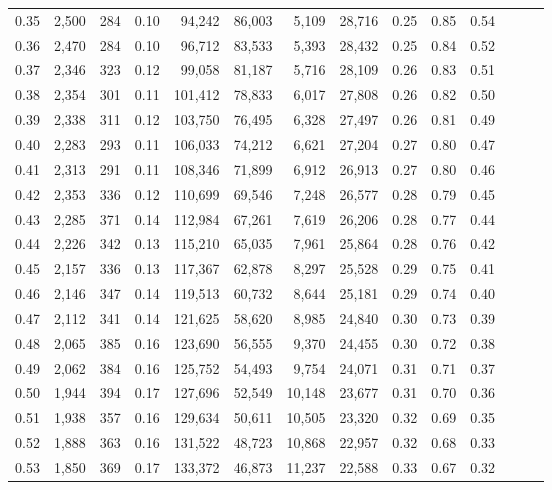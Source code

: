 \begin{tabular}{rrrrrrrrrrrrrr}
0.35 &  2,500 &    284 &  0.10 &   94,242 &   86,003 &   5,109 &  28,716 &  0.25 &  0.85 &      0.54 \\
0.36 &  2,470 &    284 &  0.10 &   96,712 &   83,533 &   5,393 &  28,432 &  0.25 &  0.84 &      0.52 \\
0.37 &  2,346 &    323 &  0.12 &   99,058 &   81,187 &   5,716 &  28,109 &  0.26 &  0.83 &      0.51 \\
0.38 &  2,354 &    301 &  0.11 &  101,412 &   78,833 &   6,017 &  27,808 &  0.26 &  0.82 &      0.50 \\
0.39 &  2,338 &    311 &  0.12 &  103,750 &   76,495 &   6,328 &  27,497 &  0.26 &  0.81 &      0.49 \\
0.40 &  2,283 &    293 &  0.11 &  106,033 &   74,212 &   6,621 &  27,204 &  0.27 &  0.80 &      0.47 \\
0.41 &  2,313 &    291 &  0.11 &  108,346 &   71,899 &   6,912 &  26,913 &  0.27 &  0.80 &      0.46 \\
0.42 &  2,353 &    336 &  0.12 &  110,699 &   69,546 &   7,248 &  26,577 &  0.28 &  0.79 &      0.45 \\
0.43 &  2,285 &    371 &  0.14 &  112,984 &   67,261 &   7,619 &  26,206 &  0.28 &  0.77 &      0.44 \\
0.44 &  2,226 &    342 &  0.13 &  115,210 &   65,035 &   7,961 &  25,864 &  0.28 &  0.76 &      0.42 \\
0.45 &  2,157 &    336 &  0.13 &  117,367 &   62,878 &   8,297 &  25,528 &  0.29 &  0.75 &      0.41 \\
0.46 &  2,146 &    347 &  0.14 &  119,513 &   60,732 &   8,644 &  25,181 &  0.29 &  0.74 &      0.40 \\
0.47 &  2,112 &    341 &  0.14 &  121,625 &   58,620 &   8,985 &  24,840 &  0.30 &  0.73 &      0.39 \\
0.48 &  2,065 &    385 &  0.16 &  123,690 &   56,555 &   9,370 &  24,455 &  0.30 &  0.72 &      0.38 \\
0.49 &  2,062 &    384 &  0.16 &  125,752 &   54,493 &   9,754 &  24,071 &  0.31 &  0.71 &      0.37 \\
0.50 &  1,944 &    394 &  0.17 &  127,696 &   52,549 &  10,148 &  23,677 &  0.31 &  0.70 &      0.36 \\
0.51 &  1,938 &    357 &  0.16 &  129,634 &   50,611 &  10,505 &  23,320 &  0.32 &  0.69 &      0.35 \\
0.52 &  1,888 &    363 &  0.16 &  131,522 &   48,723 &  10,868 &  22,957 &  0.32 &  0.68 &      0.33 \\
0.53 &  1,850 &    369 &  0.17 &  133,372 &   46,873 &  11,237 &  22,588 &  0.33 &  0.67 &      0.32 \\

\end{tabular}
